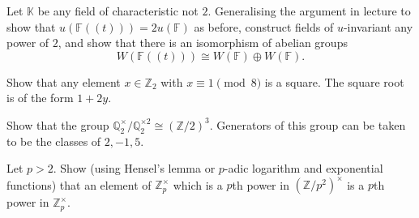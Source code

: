 \documentclass[12 pt, letterpaper]{hmcpset}
\begin{document}
\begin{problem}[(2)]
	Let $\mathbb{K}$ be any field of characteristic not $2$. Generalising the argument in lecture to show that $u(\mathbb{F}((t))) = 2 u(\mathbb{F})$ as before, construct fields of $u$-invariant any power of $2$, and show that there is an isomorphism of abelian groups
	\[
		W(\mathbb{F}((t))) \cong W(\mathbb{F}) \oplus W(\mathbb{F}).
	\]
\end{problem}

\pagebreak


\begin{problem}[(3)]
	Show that any element $x \in \mathbb{Z}_{2}$ with $x \equiv 1 \pmod 8$ is a square. The square root is of the form $1 + 2y$.
\end{problem}

\begin{problem}[(2)]
	Show that the group $\mathbb{Q}_{2}^{\times} / \mathbb{Q}_{2}^{\times 2} \cong (\mathbb{Z} / 2)^{3}$. Generators of this group can be taken to be the classes of $2, -1, 5$.
\end{problem}

\begin{problem}[(3)]
	Let $p > 2$. Show (using Hensel's lemma or $p$-adic logarithm and exponential functions) that an element of $\mathbb{Z}_{p}^{\times}$ which is a $p$th power in $(\mathbb{Z} / p^{2})^{\times}$ is a $p$th power in $\mathbb{Z}_{p}^{\times}$.
\end{problem} 
\end{document}
